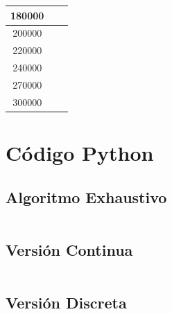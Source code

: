 \documentclass{llncs}
\begin{document}
\begin{longtable}{|c|c|c|}
			180000                   &                                                   &                                                      \\ \hline
			200000                   &                                                   &                                                      \\ \hline
			220000                   &                                                   &                                                      \\ \hline
			240000                   &                                                   &                                                      \\ \hline
			270000                   &                                                   &                                                      \\ \hline
			300000                   &                                                   &                                                      \\ \hline
	\end{longtable}
	
	\section{\textbf{Código Python}}
	\subsection{Algoritmo Exhaustivo}
	\label{subsec:pythonexhaustivo}
	\inputminted{python}{exhaustivo.py}
	\subsection{Versión Continua}
	\label{subsec:pythoncontinuo}
	\inputminted{python}{filtro_continuoLibre.py}
	\subsection{Versión Discreta}
	\label{subsec:pythondiscreto}
	
\end{document}
